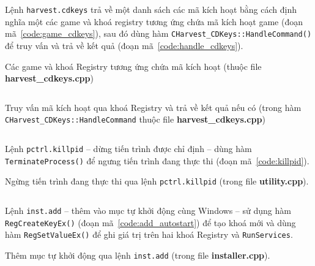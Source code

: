 \begin{exmp}
Lệnh \texttt{harvest.cdkeys} trả về một danh sách các mã kích hoạt
bằng cách định nghĩa một các game và khoá registry tương ứng chứa
mã kích hoạt game (đoạn mã~\ref{code:game_cdkeys}),
sau đó dùng hàm \texttt{CHarvest\_CDKeys::HandleCommand()}
để truy vấn và trả về kết quả (đoạn mã~\ref{code:handle_cdkeys}).
\end{exmp}

\begin{listing}[ht]
	\caption{Các game và khoá Registry tương ứng chứa mã kích hoạt (thuộc file \textbf{harvest\_cdkeys.cpp})}\label{code:game_cdkeys}
	\inputminted{cpp}{./listings/games-harvest_cdkeys.cpp}
\end{listing}

\begin{listing}[ht]
	\caption{Truy vấn mã kích hoạt qua khoá Registry và trả về kết quả nếu có (trong hàm \texttt{CHarvest\_CDKeys::HandleCommand} thuộc file \textbf{harvest\_cdkeys.cpp})}\label{code:handle_cdkeys}
	\inputminted{cpp}{./listings/handle-harvest_cdkeys.cpp}
\end{listing}

\begin{exmp}
Lệnh \texttt{pctrl.killpid} -- dừng tiến trình được chỉ định -- dùng hàm \texttt{TerminateProcess()}
để ngưng tiến trình đang thực thi (đoạn mã~\ref{code:killpid}).
\end{exmp}

\begin{listing}[ht]
	\caption{Ngừng tiến trình đang thực thi qua lệnh \texttt{pctrl.killpid} (trong file \textbf{utility.cpp}).}\label{code:killpid}
	\inputminted{cpp}{./listings/killpid-pctrl.cpp}
\end{listing}

\begin{exmp}
Lệnh \texttt{inst.add} -- thêm vào mục tự khởi động cùng Windows --
sử dụng hàm \texttt{RegCreateKeyEx()} (đoạn mã~\ref{code:add_autostart})
để tạo khoá mới và dùng hàm \texttt{RegSetValueEx()} để ghi giá trị trên hai khoá Registry
và
\texttt{RunServices}.
\end{exmp}

\begin{listing}[ht]
	\caption{Thêm mục tự khởi động qua lệnh \texttt{inst.add} (trong file \textbf{installer.cpp}).}\label{code:add_autostart}
	\inputminted{cpp}{./listings/add_autostart.cpp}
\end{listing}

